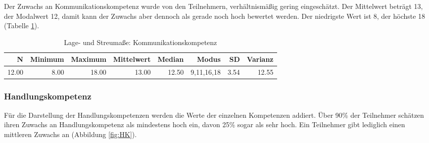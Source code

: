 \documentclass[12pt,smallheadings, bibliography=totoc]{scrartcl}
\begin{document}
Der Zuwachs an Kommunikationskompetenz wurde von den Teilnehmern,
verhältnismäßig gering eingeschätzt. Der Mittelwert beträgt 13, der
Modalwert 12, damit kann der Zuwachs aber dennoch als gerade noch hoch
bewertet werden. Der niedrigste Wert ist 8, der höchste 18 (Tabelle
\ref{tab:lKK}).

\begin{table}[H]
\centering
\caption{Lage- und Streumaße: Kommunikationskompetenz}
\label{tab:lKK}
\begin{tabular}{rrrrrrrr}
  \hline
  N & Minimum & Maximum & Mittelwert & Median & Modus & SD & Varianz \\
  \hline
 12.00 & 8.00 & 18.00 & 13.00 & 12.50 & 9,11,16,18 & 3.54 & 12.55 \\

\end{tabular}
\end{table}

\subsubsection{Handlungskompetenz}\label{handlungskompetenz-1}

Für die Darstellung der Handlungskompetenzen werden die Werte der
einzelnen Kompetenzen addiert. Über 90\% der Teilnehmer schätzen ihren
Zuwachs an Handlungskompetenz als mindestens hoch ein, davon 25\% sogar
als sehr hoch. Ein Teilnehmer gibt lediglich einen mittleren Zuwachs an
(Abbildung \ref{fig:HK}).
\end{document}
